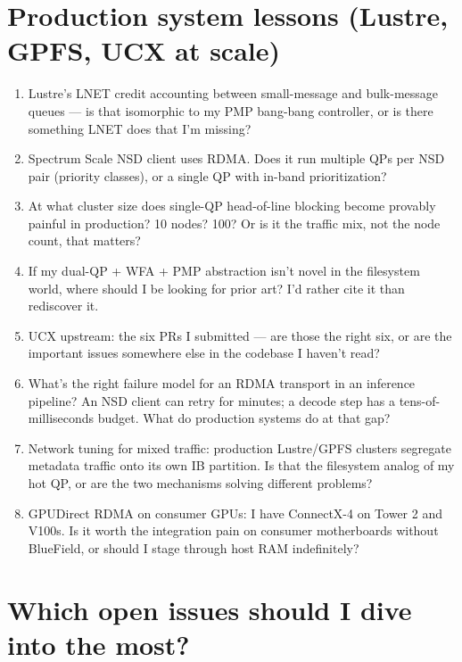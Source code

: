 \documentclass[11pt]{article}
\begin{document}
\section{Production system lessons (Lustre, GPFS, UCX at scale)}

\begin{enumerate}
\item Lustre's LNET credit accounting between small-message and
bulk-message queues --- is that isomorphic to my PMP bang-bang
controller, or is there something LNET does that I'm missing?

\item Spectrum Scale NSD client uses RDMA. Does it run multiple QPs
per NSD pair (priority classes), or a single QP with in-band
prioritization?

\item At what cluster size does single-QP head-of-line blocking
become provably painful in production? 10 nodes? 100? Or is it the
traffic mix, not the node count, that matters?

\item If my dual-QP + WFA + PMP abstraction isn't novel in the
filesystem world, where should I be looking for prior art? I'd rather
cite it than rediscover it.

\item UCX upstream: the six PRs I submitted --- are those the right
six, or are the important issues somewhere else in the codebase I
haven't read?

\item What's the right failure model for an RDMA transport in an
inference pipeline? An NSD client can retry for minutes; a decode step
has a tens-of-milliseconds budget. What do production systems do at
that gap?

\item Network tuning for mixed traffic: production Lustre/GPFS
clusters segregate metadata traffic onto its own IB partition. Is
that the filesystem analog of my hot QP, or are the two mechanisms
solving different problems?

\item GPUDirect RDMA on consumer GPUs: I have ConnectX-4 on Tower 2
and V100s. Is it worth the integration pain on consumer motherboards
without BlueField, or should I stage through host RAM indefinitely?
\end{enumerate}

\section{Which open issues should I dive into the most?}
\end{document}
